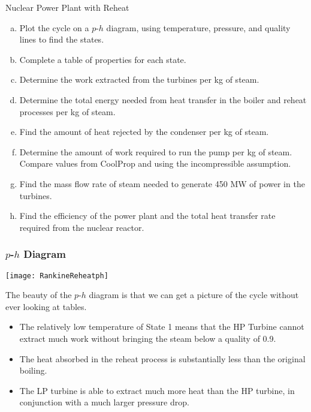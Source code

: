 \begin{example}[label=ex:RankineReheat]{Nuclear Power Plant with Reheat}
  \begin{enumerate}[a)]
  \item Plot the cycle on a $p$-$h$ diagram, using temperature, pressure, and quality lines to find the states.
  \item Complete a table of properties for each state.
  \item Determine the work extracted from the turbines per kg of steam.
  \item Determine the total energy needed from heat transfer in the boiler and reheat processes per kg of steam.
  \item Find the amount of heat rejected by the condenser per kg of steam.
  \item Determine the amount of work required to run the pump per kg of steam.  Compare values from CoolProp and using the incompressible assumption.
  \item Find the mass flow rate of steam needed to generate 450 MW of power in the turbines.
  \item Find the efficiency of the power plant and the total heat transfer rate required from the nuclear reactor.
  \end{enumerate}

  \subsubsection*{$p$-$h$ Diagram}
  
  \begin{center}
    \texttt{[image: RankineReheatph]}
  \end{center}

  The beauty of the $p$-$h$ diagram is that we can get a picture of the cycle without ever looking at tables.
  \begin{itemize}
  \item The relatively low temperature of State 1 means that the HP Turbine cannot extract much work without bringing the steam below a quality of 0.9.
  \item The heat absorbed in the reheat process is substantially less than the original boiling.
  \item The LP turbine is able to extract much more heat than the HP turbine, in conjunction with a much larger pressure drop.
  \end{itemize}


\end{example}
